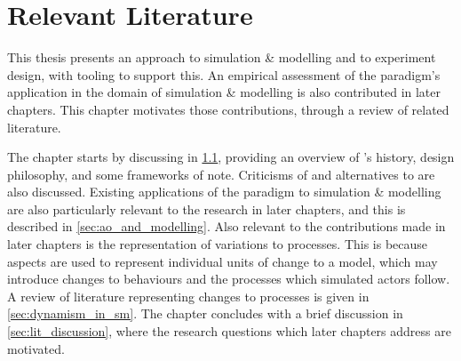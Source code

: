\chapter{Relevant Literature}\label{chap:lit_review}


This thesis presents an \aspectoriented{} approach to simulation \& modelling
and to experiment design, with tooling to support this. An empirical assessment
of the paradigm's application in the domain of simulation \& modelling is also
contributed in later chapters. This chapter motivates those contributions,
through a review of related literature.

The chapter starts by discussing \aop{} in
\cref{aspect_oriented_programming_litreview}, providing an overview of \aop{}'s
history, design philosophy, and some \aspectorientation{} frameworks of note.
Criticisms of and alternatives to \aop{} are also discussed. Existing
applications of the paradigm to simulation \& modelling are also particularly
relevant to the research in later chapters, and this is described in
\cref{sec:ao_and_modelling}. Also relevant to the contributions made in later
chapters is the representation of variations to processes. This is because
aspects are used to represent individual units of change to a model, which may
introduce changes to behaviours and the processes which simulated actors follow.
A review of literature representing changes to processes is given in
\cref{sec:dynamism_in_sm}. The chapter concludes with a brief discussion in
\cref{sec:lit_discussion}, where the research questions which later chapters
address are motivated.
 




\section{\AOP{}}
\label{aspect_oriented_programming_litreview}

